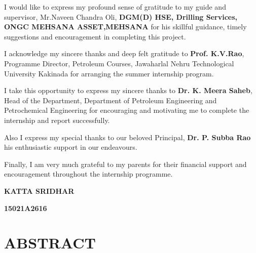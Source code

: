 \documentclass[11pt,a4paper]{report}
\begin{document}
\doublespacing


\vspace{1em}

I would like to express my profound sense of gratitude to my guide and supervisor, Mr.Naveen Chandra Oli, \textbf{DGM(D) HSE, Drilling Services, ONGC MEHSANA ASSET,MEHSANA} for his skillful guidance, timely suggestions and encouragement in completing this project.

\vspace{1em}


I acknowledge my sincere thanks and deep felt gratitude to \textbf{Prof. K.V.Rao}, Programme Director, Petroleum Courses, Jawaharlal Nehru Technological University Kakinada for arranging the summer internship program.

\vspace{1em}

I take this opportunity to express my sincere thanks to \textbf{Dr. K. Meera Saheb}, Head of the Department, Department of Petroleum Engineering and Petrochemical Engineering for encouraging and motivating me to complete the internship and report successfully.

\vspace{1em}

Also I express my special thanks to our beloved Principal, \textbf{Dr. P. Subba Rao} his enthusiastic support in our endeavours.

\vspace{1em}

Finally, I am very much grateful to my parents for their financial support and encouragement throughout the internship programme.

\vspace{1em}

\hfill \textbf{KATTA SRIDHAR}

\hfill \textbf{15021A2616} \hspace{0.005\textwidth}

\newpage

\tableofcontents


\newpage

\section*{\centering ABSTRACT}

\end{document}
